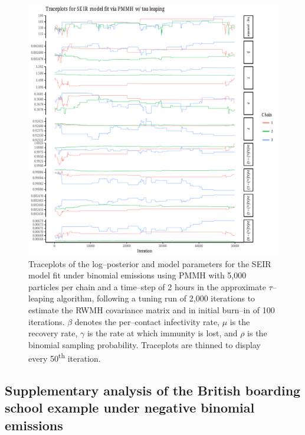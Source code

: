 \begin{figure}[htbp]
	\centering
	\includegraphics[width=\linewidth]{figures/bbs_seir_pmmh_traceplots.pdf}
	\caption[Traceplots for SEIR model parameters fit to the boarding school data using PMMH.]{Traceplots of the log--posterior and model parameters for the SEIR model fit under binomial emissions using PMMH with 5,000 particles per chain and a time--step of 2 hours in the approximate $ \tau $--leaping algorithm, following a tuning run of 2,000 iterations to estimate the RWMH covariance matrix and in initial burn--in of 100 iterations. $ \beta $ denotes the per--contact infectivity rate, $ \mu $ is the recovery rate, $ \gamma $ is the rate at which immunity is lost, and $ \rho $ is the binomial sampling probability. Traceplots are thinned to display every 50\textsuperscript{th} iteration.}
	\label{fig:bbs_seir_pmmh_traceplots}
\end{figure}

\newpage 

\subsection{Supplementary analysis of the British boarding school example under negative binomial emissions}
\label{sec:bbs_neg_binom}

